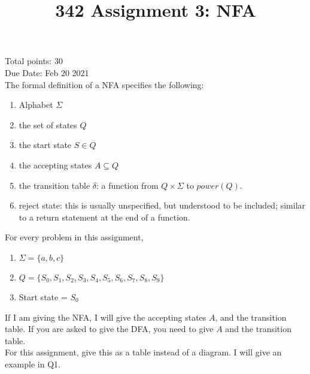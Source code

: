 \documentclass[10pt]{article}
\title{342 Assignment 3: NFA}
\begin{document}
\maketitle

Total points: 30\\
Due Date: Feb $20$ 2021\\

The formal definition of a NFA specifies the following:\\
\begin{enumerate}
    \item Alphabet $\Sigma$
    \item the set of states $Q$
    \item the start state $S \in Q$
    \item the accepting states $A \subseteq  Q$
    \item the transition table $\delta$: a function from $Q \times \Sigma$ to $power(Q)$.
    \item reject state: this is usually unspecified, but understood to be included; similar to a return statement at the end of a function.
\end{enumerate}

For every problem in this assignment, 
\begin{enumerate}
    \item $\Sigma = \{a,b,c\}$
    \item $Q = \{S_0,S_1,S_2,S_3,S_4,S_5,S_6,S_7,S_8,S_9\}$
    \item Start state = $S_0$ 
\end{enumerate}
If I am giving the NFA, I will give the accepting states $A$, and the transition table. If you are asked to give the DFA, you need to give $A$ and the transition table.\\ 
For this assignment, give this as a table instead of a diagram. I will give an example in Q1.
\end{document}

